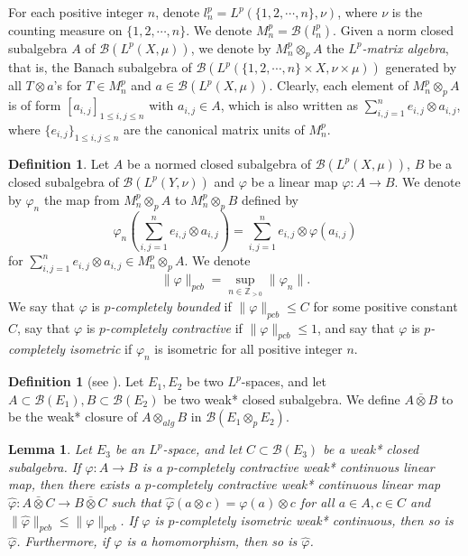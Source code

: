 \documentclass[reqno,11pt]{amsart}
\theoremstyle{plain}
\newtheorem{lem}[thm]{Lemma}
\theoremstyle{definition}
\newtheorem{defn}[thm]{Definition}
\theoremstyle{remark}
\begin{document}
For each positive integer $n$, {denote $l_n^p=L^p(\{1,2,\cdots,n\},\nu)$, where $\nu$ is the counting measure on $\{1,2,\cdots,n\}$.
We denote $M_n^p=\mathcal{B}(l_n^p)$}.
Given a norm closed subalgebra $A$ of $\mathcal{B}(L^p(X,\mu))$, we denote by $M_n^p\otimes_p A$ the {\it $L^p$-matrix algebra}, that is, the Banach subalgebra of $\mathcal{B}(L^p(\{1,2,\cdots,n\}\times X,\nu\times\mu))$ generated by all $T\otimes a$'s for $T\in M_n^p$ and $a\in \mathcal{B}(L^p(X,\mu))$. Clearly, each element of $M_n^p\otimes_p A$ is of form $[a_{i,j}]_{1\leq i,j\leq n}$ with $a_{i,j}\in A$,
which is also written as $\sum_{i,j=1}^n e_{i,j}\otimes a_{i,j}$, where $\{e_{i,j}\}_{1\leq i,j\leq n}$ are the canonical matrix units of $M_n^p$.


\begin{defn} %
Let $A$ be a normed closed subalgebra of $\mathcal{B}\left(L^p(X,\mu)\right)$, $B$ be a closed subalgebra of $\mathcal{B}\left(L^p(Y,\nu)\right)$
and $\varphi$ be a linear map $\varphi: A\rightarrow B$.  We denote by $\varphi_n$ the map from $M_n^p\otimes_p A$ to $M_n^p\otimes_p B$ defined by $$\varphi_n\left(\sum_{i,j=1}^n e_{i,j}\otimes a_{i,j}\right)=\sum_{i,j=1}^n e_{i,j}\otimes \varphi(a_{i,j}) $$ for
$\sum_{i,j=1}^n e_{i,j}\otimes a_{i,j}\in M_n^p\otimes_p A$.
We denote $$\|\varphi\|_{pcb}=\sup_{n\in \mathbb{Z}_{>0}}\| \varphi_n\|.$$
We say that $\varphi$ is {\it $p$-completely bounded} if $\|\varphi\|_{pcb}\leq C$ for some positive constant $C$, say that $\varphi$ is {\it $p$-completely contractive} if $\|\varphi\|_{pcb}\leq 1$, and say that $\varphi$ is {\it $p$-completely isometric} if $\varphi_n$ is isometric for all positive integer  $n$.
\end{defn}

\begin{defn}[{see \cite{Daws}}]
Let $E_1, E_2$ be two $L^p$-spaces, and let $A\subset\mathcal{B}(E_1), B\subset\mathcal{B}(E_2)$ be two weak* closed subalgebra. We define $A\bar{\otimes}B$ to be the weak* closure of $A\otimes_{alg} B$ in $\mathcal{B}(E_1\otimes_p E_2)$.
\end{defn}

\begin{lem} \label{tensor}
Let $E_3$ be an $L^p$-space, and let $C\subset\mathcal{B}(E_3)$ be a weak* closed subalgebra.
 If $\varphi:A\rightarrow B$ is a $p$-completely contractive weak* continuous linear map, then there exists a $p$-completely contractive weak* continuous linear map $\hat{\varphi}:A\bar{\otimes}C\rightarrow B\bar{\otimes}C$ such that $\hat{\varphi}(a\otimes c)=\varphi(a)\otimes c$ for all $a\in A, c\in C$ and $\|\hat{\varphi}\|_{pcb}\leq\|\varphi\|_{pcb}$. If $\varphi$ is $p$-completely isometric weak* continuous, then so is $\hat{\varphi}$. Furthermore, if $\varphi$ is a homomorphism, then so is $\hat{\varphi}$.
\end{lem}
\end{document}
